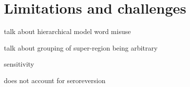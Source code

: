 \section{Limitations and challenges}
talk about hierarchical model word misuse

talk about grouping of super-region being arbitrary

sensitivity

does not account for seroreversion